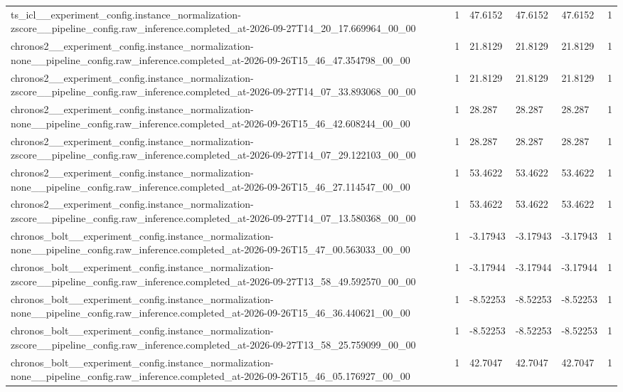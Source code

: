 \begin{tabular}{llllll}
ts\_icl\_\_experiment\_config.instance\_normalization-zscore\_\_pipeline\_config.raw\_inference.completed\_at-2026-09-27T14\_20\_17.669964\_00\_00 & 1 & 47.6152 & 47.6152 & 47.6152 & 1 \\
chronos2\_\_experiment\_config.instance\_normalization-none\_\_pipeline\_config.raw\_inference.completed\_at-2026-09-26T15\_46\_47.354798\_00\_00 & 1 & 21.8129 & 21.8129 & 21.8129 & 1 \\
chronos2\_\_experiment\_config.instance\_normalization-zscore\_\_pipeline\_config.raw\_inference.completed\_at-2026-09-27T14\_07\_33.893068\_00\_00 & 1 & 21.8129 & 21.8129 & 21.8129 & 1 \\
chronos2\_\_experiment\_config.instance\_normalization-none\_\_pipeline\_config.raw\_inference.completed\_at-2026-09-26T15\_46\_42.608244\_00\_00 & 1 & 28.287 & 28.287 & 28.287 & 1 \\
chronos2\_\_experiment\_config.instance\_normalization-zscore\_\_pipeline\_config.raw\_inference.completed\_at-2026-09-27T14\_07\_29.122103\_00\_00 & 1 & 28.287 & 28.287 & 28.287 & 1 \\
chronos2\_\_experiment\_config.instance\_normalization-none\_\_pipeline\_config.raw\_inference.completed\_at-2026-09-26T15\_46\_27.114547\_00\_00 & 1 & 53.4622 & 53.4622 & 53.4622 & 1 \\
chronos2\_\_experiment\_config.instance\_normalization-zscore\_\_pipeline\_config.raw\_inference.completed\_at-2026-09-27T14\_07\_13.580368\_00\_00 & 1 & 53.4622 & 53.4622 & 53.4622 & 1 \\
chronos\_bolt\_\_experiment\_config.instance\_normalization-none\_\_pipeline\_config.raw\_inference.completed\_at-2026-09-26T15\_47\_00.563033\_00\_00 & 1 & -3.17943 & -3.17943 & -3.17943 & 1 \\
chronos\_bolt\_\_experiment\_config.instance\_normalization-zscore\_\_pipeline\_config.raw\_inference.completed\_at-2026-09-27T13\_58\_49.592570\_00\_00 & 1 & -3.17944 & -3.17944 & -3.17944 & 1 \\
chronos\_bolt\_\_experiment\_config.instance\_normalization-none\_\_pipeline\_config.raw\_inference.completed\_at-2026-09-26T15\_46\_36.440621\_00\_00 & 1 & -8.52253 & -8.52253 & -8.52253 & 1 \\
chronos\_bolt\_\_experiment\_config.instance\_normalization-zscore\_\_pipeline\_config.raw\_inference.completed\_at-2026-09-27T13\_58\_25.759099\_00\_00 & 1 & -8.52253 & -8.52253 & -8.52253 & 1 \\
chronos\_bolt\_\_experiment\_config.instance\_normalization-none\_\_pipeline\_config.raw\_inference.completed\_at-2026-09-26T15\_46\_05.176927\_00\_00 & 1 & 42.7047 & 42.7047 & 42.7047 & 1 \\

\end{tabular}
